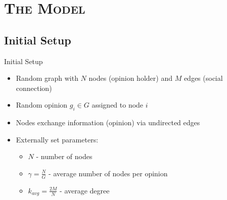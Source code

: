 \documentclass[xcolor=x11names,compress]{beamer}
\renewcommand{\(}{\begin{columns}}
\renewcommand{\)}{\end{columns}}
\newcommand{\<}[1]{\begin{column}{#1}}
\renewcommand{\>}{\end{column}}
\begin{document}
\section{\scshape The Model}

\subsection{Initial Setup}
\begin{frame}{Initial Setup}
\begin{itemize}
\item Random graph with $N$ nodes (opinion holder) and $M$ edges (social connection)
\item Random opinion $g_i \in G$ assigned to node $i$ 
\item Nodes exchange information (opinion) via undirected edges
\item Externally set parameters:
\begin{itemize}
\item $N$ - number of nodes
\item $\gamma = \frac{N}{G}$ - average number of nodes per opinion
\item $k_{avg}=\frac{2M}{N}$ - average degree
\end{itemize}
\end{itemize}
\end{frame}

\end{document}
